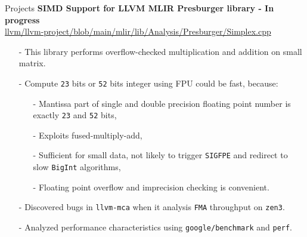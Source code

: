 \documentclass{resume} %
\newcommand{\itemsepval}{-6pt}
\newcommand{\code}{\texttt}
\begin{document}
\begin{rSection}{Projects}
    \textbf{SIMD Support for LLVM MLIR Presburger library - In progress} \hfill \\
    \url{llvm/llvm-project/blob/main/mlir/lib/Analysis/Presburger/Simplex.cpp} \hfill \par
    \begin{itemize}
        \itemsep \itemsepval {} 
        \item[-] This library performs overflow-checked multiplication and addition on small matrix. 
        \item[-] Compute \code{23} bits or \code{52} bits integer using FPU could be fast, because: 
        \begin{itemize}
            \itemsep \itemsepval {} 
            \item[-] Mantissa part of single and double precision floating point number is exactly \code{23} and \code{52} bits,
            \item[-] Exploits fused-multiply-add,
            \item[-] Sufficient for small data, not likely to trigger \code{SIGFPE} and redirect to slow \code{BigInt} algorithms, 
            \item[-] Floating point overflow and imprecision checking is convenient.
        \end{itemize}
    \item[-] Discovered bugs in \code{llvm-mca} when it analysis \code{FMA} throughput on \code{zen3}. 
    \item[-] Analyzed performance characteristics using \code{google/benchmark} and \code{perf}.
    \end{itemize}

    

\end{rSection}
\end{document}
